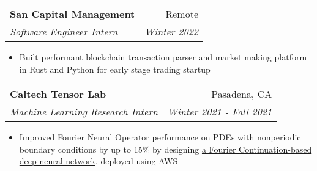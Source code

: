 \documentclass[letterpaper,11pt]{article}
\makeatletter
\newcommand{\resitem}[1]{\item[--] #1}
\newcommand{\ressubheading}[4]{
	\vspace{3pt}
	\begin{tabular*}{7.5in}{l@{\extracolsep{\fill}}r}
			\textbf{#1} & #2 \\
			\textit{#3} & \textit{#4}
	\end{tabular*}
}
\newcommand{\projsubheading}[2]{
	\vspace{3pt}
	\begin{tabular*}{7.5in}{l@{\extracolsep{\fill}}r}
		\textbf{#1} & #2
	\end{tabular*}
}
\makeatother
\begin{document}
\ressubheading{San Capital Management}{Remote}{Software Engineer Intern} {Winter 2022}
\begin{itemize}
	\resitem{
		Built performant blockchain transaction parser and market making
		platform in Rust and Python for early stage trading startup
	}
\end{itemize}

\ressubheading{Caltech Tensor Lab}
{Pasadena, CA}
{Machine Learning Research Intern}
{Winter 2021 - Fall 2021}
\begin{itemize}
	\resitem{
		Improved Fourier Neural Operator performance on PDEs with nonperiodic
		boundary conditions by up to 15\% by designing
		\href{https://symposium.foragerone.com/caltech-sfp-summer-seminar-day-2021/presentations/32348}
		{a Fourier Continuation-based deep neural network},
		deployed using AWS
	}
\end{itemize}



\end{document}
